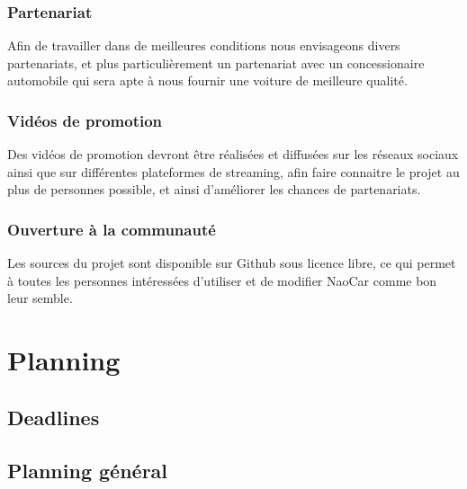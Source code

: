 \documentclass[11pt]{report} %
\begin{document}
		\subsection{Partenariat}
			Afin de travailler dans de meilleures conditions nous envisageons divers partenariats, et plus particulièrement un partenariat avec un concessionaire automobile qui sera apte à nous fournir une voiture de meilleure qualité.
		\subsection{Vidéos de promotion}
			Des vidéos de promotion devront être réalisées et diffusées sur les réseaux sociaux ainsi que sur différentes plateformes de streaming, afin faire connaitre le projet au plus de personnes possible, et ainsi d'améliorer les chances de partenariats.
		\subsection{Ouverture à la communauté}
			Les sources du projet sont disponible sur Github sous licence libre, ce qui permet à toutes les personnes intéressées d'utiliser et de modifier NaoCar comme bon leur semble.
\chapter{Planning}
	\section{Deadlines}
	\section{Planning général}
\end{document}
